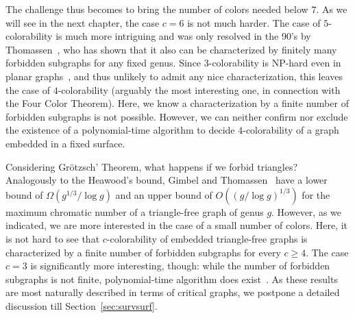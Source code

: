 \documentclass[12pt,twoside,openright,a4paper]{book}
\begin{document}
The challenge thus becomes to bring the number of colors needed below $7$. As we will see in the next chapter, the case $c=6$ is not
much harder.  The case of $5$-colorability is much more intriguing and was only resolved in the 90's by Thomassen~\cite{Thomassen97},
who has shown that it also can be characterized by finitely many forbidden subgraphs for any fixed genus.
Since $3$-colorability is NP-hard even in planar graphs~\cite{garey1979computers}, and thus unlikely to admit any nice characterization,
this leaves the case of $4$-colorability (arguably the most interesting one, in connection with the Four Color Theorem).
Here, we know a characterization by a finite number of forbidden subgraphs is not possible.  However, we can neither confirm nor
exclude the existence of a polynomial-time algorithm to decide $4$-colorability of a graph embedded in a fixed surface.

Considering Gr\"{o}tzsch' Theorem, what happens if we forbid triangles?  Analogously to the Heawood's bound,
Gimbel and Thomassen~\cite{gimbel} have a lower bound of $\Omega(g^{1/3}/\log g)$ and an upper
bound of $O((g/\log g)^{1/3})$ for the maximum chromatic number of a triangle-free graph
of genus $g$.  However, as we indicated, we are more interested in the case of a small number of colors.
Here, it is not hard to see that $c$-colorability of embedded triangle-free graphs is characterized by a finite number
of forbidden subgraphs for every $c\ge 4$.  The case $c=3$ is significantly more interesting, though:
while the number of forbidden subgraphs is not finite, polynomial-time algorithm does exist~\cite{trfree7}.
As these results are most naturally described in terms of critical graphs, we postpone a detailed discussion till Section~\ref{sec:survsurf}.
\end{document}
